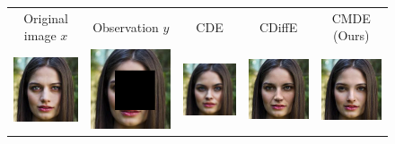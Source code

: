   
    

  \begin{figure}[ht]
    \begin{center}
      \begingroup
      \setlength{\tabcolsep}{4pt} %
      \begin{tabular}{ccccc}
        \small Original image $x$ & \small Observation $y$ & \small CDE & \small CDiffE & \small CMDE (Ours) \\
        
        \includegraphics[width=.15\textwidth]{Chapter2/samples/inpainting/table/1/x.png} &   
        \includegraphics[width=.15\textwidth]{Chapter2/samples/inpainting/table/1/y.png} &
        \includegraphics[width=.15\textwidth]{Chapter2/samples/inpainting/table/1/sr3.png} & 
        \includegraphics[width=.15\textwidth]{Chapter2/samples/inpainting/table/1/Song.png} & 
        \includegraphics[width=.15\textwidth]{Chapter2/samples/inpainting/table/1/DV.png} \\
        

\end{tabular}
\end{center}
\end{figure}
